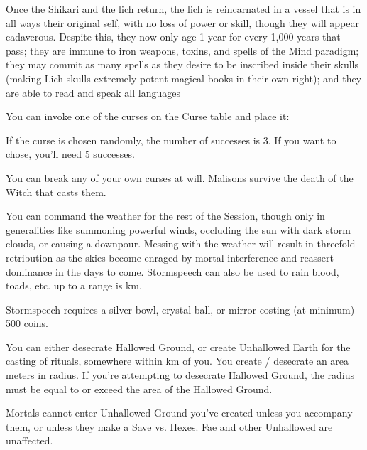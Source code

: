 {Once the Shikari and the lich return, the lich is reincarnated in a vessel that is in all ways their original self, with no loss of power or skill, though they will appear cadaverous. Despite this, they now only age 1 year for every 1,000 years that pass; they are immune to iron weapons, toxins, and spells of the Mind paradigm; they may commit as many spells as they desire to be inscribed inside their skulls (making Lich skulls extremely potent magical books in their own right); and they are able to read and speak all languages

\OCCULT[
  Name=Malison,
  Link=occultism-malison,
  Success=varies,
  Cost=66,
  Widdershins=0
]

You can invoke one of the curses on the Curse table and place it: 

If the curse is chosen randomly, the number of successes is 3. If you want to chose, you'll need 5 successes.

You can break any of your own curses at will. Malisons survive the death of the Witch that casts them.

\OCCULT[
  Name=Stormspeech,  
  Link=occultism-stormspeech,
  Success=5,
  Cost=500+,
  Widdershins=1
]

You can command the weather for the rest of the Session, though only in generalities like summoning powerful winds, occluding the sun with dark storm clouds, or causing a downpour. Messing with the weather will result in threefold retribution as the skies become enraged by mortal interference and reassert dominance in the days to come. Stormspeech can also be used to rain blood, toads, etc.  up to a range is \LVL km.

Stormspeech requires a silver bowl, crystal ball, or mirror costing (at minimum) 500 coins. 

\OCCULT[
  Name=Unhallowed Earth,
  Link=occultism-unhallowed-earth,
  Success=1,
  Cost=66,
  Widdershins=0
]

You can either desecrate Hallowed Ground, or create Unhallowed Earth for the casting of rituals, somewhere within \LVL km of you.  You create / desecrate an area \LVL meters in radius.  If you're attempting to desecrate Hallowed Ground, the radius must be equal to or exceed the area of the Hallowed Ground.

Mortals cannot enter Unhallowed Ground you've created unless you accompany them, or unless they make a Save vs. Hexes.  Fae and other Unhallowed are unaffected.

}
